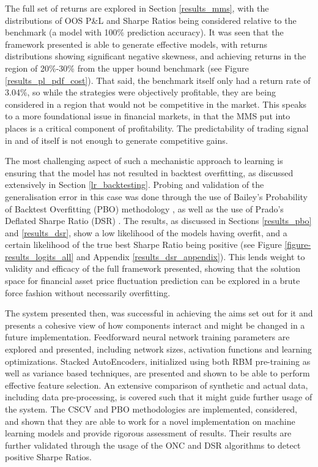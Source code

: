 \documentclass[a4paper,11pt,oneside]{article}
\theoremstyle{plain}
\theoremstyle{definition}
\begin{document}
	The full set of returns are explored in Section \ref{results_mms}, with the distributions of OOS P\&L and Sharpe Ratios being considered relative to the benchmark (a model with 100\% prediction accuracy). It was seen that the framework presented is able to generate effective models, with returns distributions showing significant negative skewness, and achieving returns in the region of 20\%-30\% from the upper bound benchmark (see Figure \ref{results_pl_pdf_cost}). That said, the benchmark itself only had a return rate of 3.04\%, so while the strategies were objectively profitable, they are being considered in a region that would not be competitive in the market. This speaks to a more foundational issue in financial markets, in that the MMS put into places is a critical component of profitability. The predictability of trading signal in and of itself is not enough to generate competitive gains.\newline
	
	The most challenging aspect of such a mechanistic approach to learning is ensuring that the model has not resulted in backtest overfitting, as discussed extensively in Section \ref{lr_backtesting}. Probing and validation of the generalisation error in this case was done through the use of Bailey's Probability of Backtest Overfitting (PBO) methodology \citep{BailyPBO}, as well as the use of Prado's Deflated Sharpe Ratio (DSR) \citep{PradoDSR}. The results, as discussed in Sections \ref{results_pbo} and \ref{results_dsr}, show a low likelihood of the models having overfit, and a certain likelihood of the true best Sharpe Ratio being positive (see Figure \ref{figure-results_logits_all} and Appendix \ref{results_dsr_appendix}). This lends weight to validity and efficacy of the full framework presented, showing that the solution space for financial asset price fluctuation prediction can be explored in a brute force fashion without necessarily overfitting.\newline

	The system presented then, was successful in achieving the aims set out for it and presents a cohesive view of how components interact and might be changed in a future implementation. Feedforward neural network training parameters are explored and presented, including network sizes, activation functions and learning optimizations. Stacked AutoEncoders, initialized using both RBM pre-training as well as variance based techniques, are presented and shown to be able to perform effective feature selection. An extensive comparison of synthetic and actual data, including data pre-processing, is covered such that it might guide further usage of the system. The CSCV and PBO methodologies are implemented, considered, and shown that they are able to work for a novel implementation on machine learning models and provide rigorous assessment of results. Their results are further validated through the usage of the ONC and DSR algorithms to detect positive Sharpe Ratios. \newline 
	
\end{document}
